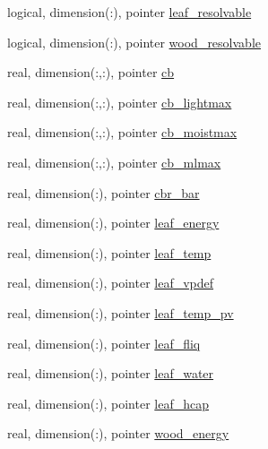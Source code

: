 \begin{DoxyCompactItemize}
\item 
logical, dimension(\+:), pointer \hyperlink{structed__state__vars_1_1patchtype_a0ac8e11805011d33ee4e08cc4ee4d39f}{leaf\+\_\+resolvable}
\item 
logical, dimension(\+:), pointer \hyperlink{structed__state__vars_1_1patchtype_a27d79cc721bc8a3dcdcc34d3e2ef18a8}{wood\+\_\+resolvable}
\item 
real, dimension(\+:,\+:), pointer \hyperlink{structed__state__vars_1_1patchtype_a40864ee1bbf9e5d7e3cb0f15e390f42b}{cb}
\item 
real, dimension(\+:,\+:), pointer \hyperlink{structed__state__vars_1_1patchtype_ae0a66dd1158f29915e35555d028df93d}{cb\+\_\+lightmax}
\item 
real, dimension(\+:,\+:), pointer \hyperlink{structed__state__vars_1_1patchtype_abcf858b5bf7abbba89e171a570ea111d}{cb\+\_\+moistmax}
\item 
real, dimension(\+:,\+:), pointer \hyperlink{structed__state__vars_1_1patchtype_afc5b892b64461db76f841e73ce0eeb85}{cb\+\_\+mlmax}
\item 
real, dimension(\+:), pointer \hyperlink{structed__state__vars_1_1patchtype_a0897bdbad84bd12c46fbae068787e375}{cbr\+\_\+bar}
\item 
real, dimension(\+:), pointer \hyperlink{structed__state__vars_1_1patchtype_afb7b933e8b49a979aaa3bbd7c899b3b4}{leaf\+\_\+energy}
\item 
real, dimension(\+:), pointer \hyperlink{structed__state__vars_1_1patchtype_ac1d24072047c43b48b6b8e0af1ad9539}{leaf\+\_\+temp}
\item 
real, dimension(\+:), pointer \hyperlink{structed__state__vars_1_1patchtype_a7306a98111c76b6b1be21ac102168005}{leaf\+\_\+vpdef}
\item 
real, dimension(\+:), pointer \hyperlink{structed__state__vars_1_1patchtype_a4f681fa0617ec7121c7d6b5b859389fb}{leaf\+\_\+temp\+\_\+pv}
\item 
real, dimension(\+:), pointer \hyperlink{structed__state__vars_1_1patchtype_af9e20e6448daeb0ecaab486379404222}{leaf\+\_\+fliq}
\item 
real, dimension(\+:), pointer \hyperlink{structed__state__vars_1_1patchtype_a0918c830b5c1249dc052766d93ca5604}{leaf\+\_\+water}
\item 
real, dimension(\+:), pointer \hyperlink{structed__state__vars_1_1patchtype_a179ebeaec1b5f832f47c099205185ffb}{leaf\+\_\+hcap}
\item 
real, dimension(\+:), pointer \hyperlink{structed__state__vars_1_1patchtype_ab49c3569272034e836468990cb4bdab8}{wood\+\_\+energy}

\end{DoxyCompactItemize}
